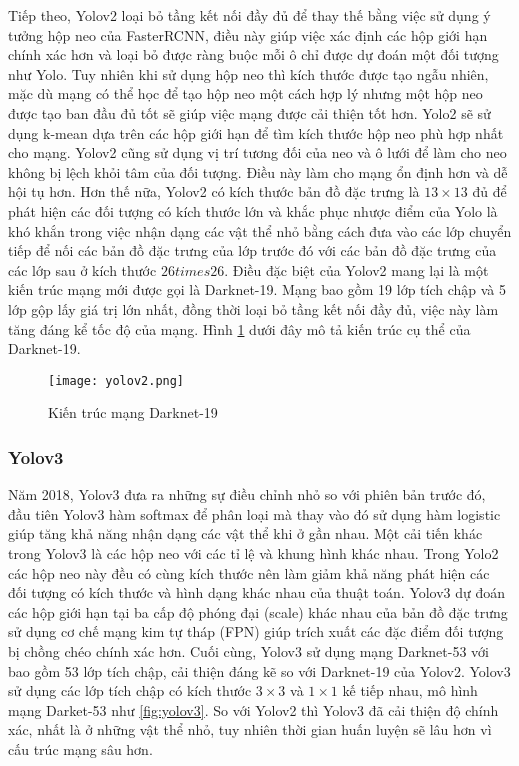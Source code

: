 \documentclass[../the.tex]{subfiles}
\begin{document}
\bigskip

{\fontsize{13}{12} \selectfont
	Tiếp theo, Yolov2 loại bỏ tầng kết nối đầy đủ để thay thế bằng việc sử dụng ý tưởng hộp neo của FasterRCNN,
	điều này giúp việc xác định các hộp giới hạn chính xác hơn và loại bỏ được ràng buộc mỗi ô chỉ được dự đoán một đối tượng như Yolo.
	Tuy nhiên khi sử dụng hộp neo thì kích thước được tạo ngẫu nhiên, mặc dù mạng có thể học để tạo hộp neo một cách hợp lý nhưng một hộp neo được tạo
	ban đầu đủ tốt sẽ giúp việc mạng được cải thiện tốt hơn. Yolo2 sẽ sử dụng k-mean dựa trên các hộp giới hạn để tìm kích thước hộp neo phù hợp nhất cho mạng.
	Yolov2 cũng sử dụng vị trí tương
	đối của neo và ô lưới để làm cho neo không bị lệch khỏi tâm của đối tượng. Điều này
	làm cho mạng ổn định hơn và dễ hội tụ hơn. Hơn thế nữa, Yolov2 có kích thước bản đồ đặc trưng là $13 \times 13$ đủ để phát hiện các đối tượng có kích thước lớn và khắc phục nhược điểm của Yolo là khó khắn trong việc nhận dạng các vật thể nhỏ
	bằng cách đưa vào các lớp chuyển tiếp để nối các bản đồ đặc trưng của lớp trước đó với các bản đồ đặc trưng của các lớp sau ở kích thước $26
		times 26$. Điều đặc biệt của Yolov2 mang lại là một kiến trúc mạng mới được gọi là Darknet-19.
	Mạng bao gồm 19 lớp tích chập và 5 lớp gộp lấy giá trị lớn nhất, đồng thời loại bỏ tầng kết nối đầy đủ, việc này làm tăng đáng kể tốc độ của mạng.
	Hình \ref{fig:yolov2} dưới đây mô tả kiến trúc cụ thể của Darknet-19.
}

\begin{figure}[H]
	\centering
	\texttt{[image: yolov2.png]}
	\caption{Kiến trúc mạng Darknet-19 \cite{deterseong}}
	\label{fig:yolov2}
\end{figure}
\bigskip

\subsubsection{Yolov3}
{\fontsize{13}{12} \selectfont
	Năm 2018, Yolov3 \cite{redmon2018yolov3} đưa ra những sự điều chỉnh nhỏ so với phiên bản trước đó, đầu tiên Yolov3 hàm softmax để phân loại mà thay vào đó sử dụng
	hàm logistic giúp tăng khả năng nhận dạng các vật thể khi ở gần nhau. Một cải tiến khác trong Yolov3 là các hộp neo với các tỉ lệ và khung hình khác nhau. Trong Yolo2 các hộp neo này đều có cùng kích thước
	nên làm giảm khả năng phát hiện các đối tượng có kích thước và hình dạng khác nhau của thuật toán. Yolov3 dự đoán các hộp giới hạn tại ba cấp độ phóng đại (scale) khác nhau của bản đồ đặc trưng sử dụng cơ chế mạng kim tự tháp (FPN)  \cite{lin2017feature}
	giúp trích xuất các đặc điểm đối tượng bị chồng chéo chính xác hơn. Cuối cùng, Yolov3 sử dụng mạng Darknet-53 với bao gồm 53 lớp tích chập, cải thiện đáng kẽ so với Darknet-19 của Yolov2.
	Yolov3 sử dụng các lớp tích chập có kích thước $3 \times 3 $ và $1 \times 1$ kế tiếp nhau, mô hình mạng Darket-53 như \ref{fig:yolov3}. So với Yolov2 thì Yolov3 đã cải thiện độ chính xác, nhất là ở những vật thể nhỏ, tuy nhiên thời gian huấn luyện sẽ lâu hơn vì cấu trúc mạng sâu hơn.

}
\end{document}
